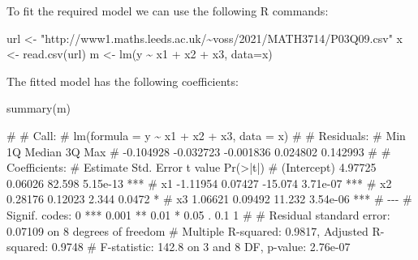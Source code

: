 \documentclass[
  a4paper,
]{article}
\newenvironment{Shaded}{\begin{snugshade}}{\end{snugshade}}
\newcommand{\AttributeTok}[1]{\textcolor[rgb]{0.77,0.63,0.00}{#1}}
\newcommand{\FunctionTok}[1]{\textcolor[rgb]{0.00,0.00,0.00}{#1}}
\newcommand{\NormalTok}[1]{#1}
\newcommand{\OtherTok}[1]{\textcolor[rgb]{0.56,0.35,0.01}{#1}}
\newcommand{\SpecialCharTok}[1]{\textcolor[rgb]{0.00,0.00,0.00}{#1}}
\newcommand{\StringTok}[1]{\textcolor[rgb]{0.31,0.60,0.02}{#1}}
\theoremstyle{definition}
\theoremstyle{definition}
\theoremstyle{definition}
\theoremstyle{definition}
\theoremstyle{remark}
\begin{document}
\begin{myanswers}

To fit the required model we can use the following R commands:

\begin{Shaded}
\begin{Highlighting}[]
\NormalTok{url }\OtherTok{\textless{}{-}} \StringTok{"http://www1.maths.leeds.ac.uk/\textasciitilde{}voss/2021/MATH3714/P03Q09.csv"}
\NormalTok{x }\OtherTok{\textless{}{-}} \FunctionTok{read.csv}\NormalTok{(url)}
\NormalTok{m }\OtherTok{\textless{}{-}} \FunctionTok{lm}\NormalTok{(y }\SpecialCharTok{\textasciitilde{}}\NormalTok{ x1 }\SpecialCharTok{+}\NormalTok{ x2 }\SpecialCharTok{+}\NormalTok{ x3, }\AttributeTok{data=}\NormalTok{x)}
\end{Highlighting}
\end{Shaded}

The fitted model has the following coefficients:

\begin{Shaded}
\begin{Highlighting}[]
\FunctionTok{summary}\NormalTok{(m)}
\end{Highlighting}
\end{Shaded}

\begin{Shaded}
\begin{Highlighting}[]
\NormalTok{\# }
\NormalTok{\# Call:}
\NormalTok{\# lm(formula = y \textasciitilde{} x1 + x2 + x3, data = x)}
\NormalTok{\# }
\NormalTok{\# Residuals:}
\NormalTok{\#       Min        1Q    Median        3Q       Max }
\NormalTok{\# {-}0.104928 {-}0.032723 {-}0.001836  0.024802  0.142993 }
\NormalTok{\# }
\NormalTok{\# Coefficients:}
\NormalTok{\#             Estimate Std. Error t value Pr(\textgreater{}|t|)    }
\NormalTok{\# (Intercept)  4.97725    0.06026  82.598 5.15e{-}13 ***}
\NormalTok{\# x1          {-}1.11954    0.07427 {-}15.074 3.71e{-}07 ***}
\NormalTok{\# x2           0.28176    0.12023   2.344   0.0472 *  }
\NormalTok{\# x3           1.06621    0.09492  11.232 3.54e{-}06 ***}
\NormalTok{\# {-}{-}{-}}
\NormalTok{\# Signif. codes:  0 \textquotesingle{}***\textquotesingle{} 0.001 \textquotesingle{}**\textquotesingle{} 0.01 \textquotesingle{}*\textquotesingle{} 0.05 \textquotesingle{}.\textquotesingle{} 0.1 \textquotesingle{} \textquotesingle{} 1}
\NormalTok{\# }
\NormalTok{\# Residual standard error: 0.07109 on 8 degrees of freedom}
\NormalTok{\# Multiple R{-}squared:  0.9817,  Adjusted R{-}squared:  0.9748 }
\NormalTok{\# F{-}statistic: 142.8 on 3 and 8 DF,  p{-}value: 2.76e{-}07}
\end{Highlighting}
\end{Shaded}

\end{myanswers}
\end{document}
